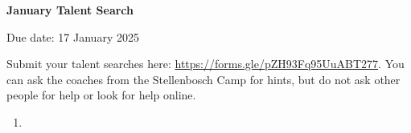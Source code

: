 \documentclass[12pt]{article}
\begin{document}
\begin{center} \bfseries \large
    January Talent Search

    Due date: 17 January 2025
\end{center}

\bigskip
Submit your talent searches here: \url{https://forms.gle/pZH93Fq95UuABT277}.
You can ask the coaches from the Stellenbosch Camp for hints, but do not ask other people for help or look for help online.

\begin{enumerate}[topsep=\bigskipamount,itemsep=\bigskipamount]
\item 

\end{enumerate}
\end{document}

